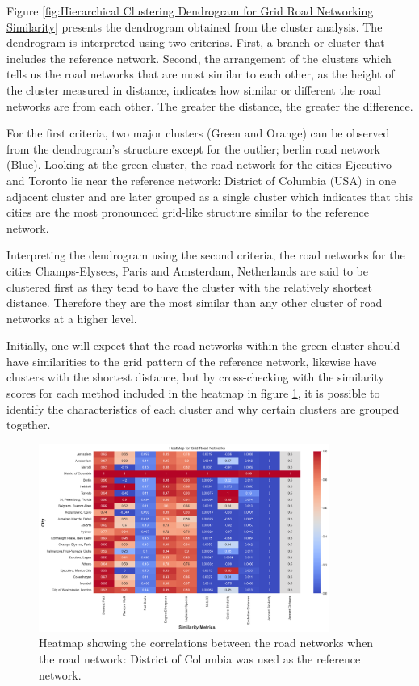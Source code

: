 Figure \ref{fig:Hierarchical Clustering Dendrogram for Grid Road Networking Similarity} presents the dendrogram obtained from the cluster analysis. The dendrogram  is interpreted using two criterias. First, a branch or cluster that includes the reference network. Second, the arrangement of the clusters which tells us the road networks that are most similar to each other, as the height of the cluster measured in distance, indicates how similar or different the road networks are from each other. The greater the distance, the greater the difference. 

For the first criteria, two major clusters (Green and Orange) can be observed from the dendrogram's structure except for the outlier; berlin road network (Blue). Looking at the green cluster, the road network for the cities Ejecutivo and Toronto lie near the reference network: District of Columbia (USA) in one adjacent cluster and are later grouped as a single cluster which indicates that this cities are the most pronounced grid-like structure similar to the reference network. 

Interpreting the dendrogram using the second criteria, the road networks for the cities Champs-Elysees, Paris and Amsterdam, Netherlands are said to be clustered first as they tend to have the cluster with the relatively shortest distance. Therefore they are the most similar than any other cluster of road networks at a higher level.

Initially, one will expect that the road networks within the green cluster should have similarities to the grid pattern of the reference network, likewise have clusters with the shortest distance, but by cross-checking with the similarity scores for each method included in the heatmap in figure \ref{fig:Heatmap showing the correlations for Grid Road Networks}, it is possible to identify the characteristics of each cluster and why certain clusters are grouped together.

\begin{figure}[!ht]
\centering
\includegraphics[width=0.85\textwidth,center]{picture/Grid/gridheatmap.png}
\caption[Heatmap showing the correlations for Grid Road Networks]{Heatmap showing the correlations between the road networks when the road network: District of Columbia was used as the reference network.}
\label{fig:Heatmap showing the correlations for Grid Road Networks}
\end{figure}


